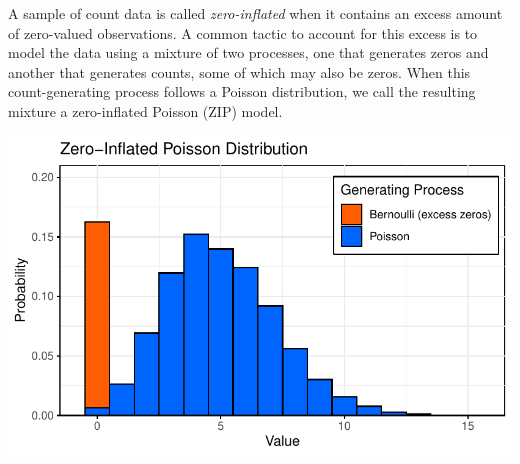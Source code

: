 \documentclass[
  12pt]{article}
\begin{document}
A sample of count data is called \emph{zero-inflated} when it contains
an excess amount of zero-valued observations. A common tactic to account
for this excess is to model the data using a mixture of two processes,
one that generates zeros and another that generates counts, some of
which may also be zeros. When this count-generating process follows a
Poisson distribution, we call the resulting mixture a zero-inflated
Poisson (ZIP) model.

\includegraphics{Paper_files/figure-pdf/unnamed-chunk-1-1.pdf}
\end{document}
